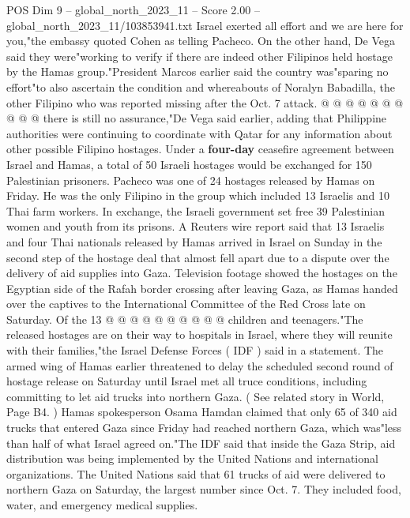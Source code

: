\begin{textsample}{POS Dim 9 – global\_north\_2023\_11 – Score 2.00 – global\_north\_2023\_11/103853941.txt}
Israel exerted all effort and we are here for you,"the embassy quoted Cohen as telling Pacheco.
On the other hand, De Vega said they were"working to verify if there are indeed other Filipinos held hostage by the Hamas group."President Marcos earlier said the country was"sparing no effort"to also ascertain the condition and whereabouts of Noralyn Babadilla, the other Filipino who was reported missing after the Oct. 7 attack. @ @ @ @ @ @ @ @ @ @ there is still no assurance,"De Vega said earlier, adding that Philippine authorities were continuing to coordinate with Qatar for any information about other possible Filipino hostages.
Under a \textbf{four-day} ceasefire agreement between Israel and Hamas, a total of 50 Israeli hostages would be exchanged for 150 Palestinian prisoners.
Pacheco was one of 24 hostages released by Hamas on Friday.
He was the only Filipino in the group which included 13 Israelis and 10 Thai farm workers.
In exchange, the Israeli government set free 39 Palestinian women and youth from its prisons.
A Reuters wire report said that 13 Israelis and four Thai nationals released by Hamas arrived in Israel on Sunday in the second step of the hostage deal that almost fell apart due to a dispute over the delivery of aid supplies into Gaza.
Television footage showed the hostages on the Egyptian side of the Rafah border crossing after leaving Gaza, as Hamas handed over the captives to the International Committee of the Red Cross late on Saturday.
Of the 13 @ @ @ @ @ @ @ @ @ @ children and teenagers."The released hostages are on their way to hospitals in Israel, where they will reunite with their families,"the Israel Defense Forces ( IDF ) said in a statement.
The armed wing of Hamas earlier threatened to delay the scheduled second round of hostage release on Saturday until Israel met all truce conditions, including committing to let aid trucks into northern Gaza. ( See related story in World, Page B4. ) Hamas spokesperson Osama Hamdan claimed that only 65 of 340 aid trucks that entered Gaza since Friday had reached northern Gaza, which was"less than half of what Israel agreed on."The IDF said that inside the Gaza Strip, aid distribution was being implemented by the United Nations and international organizations.
The United Nations said that 61 trucks of aid were delivered to northern Gaza on Saturday, the largest number since Oct. 7.
They included food, water, and emergency medical supplies.

\end{textsample}
